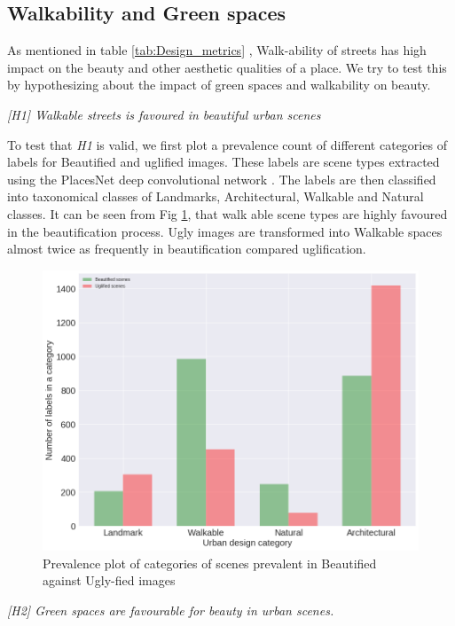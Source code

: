 \subsection{Walkability and Green spaces}
As mentioned in table \ref{tab:Design_metrics} , Walk-ability of streets has high impact on the beauty and other aesthetic qualities of a place. We try to test this by hypothesizing about the impact of green spaces and walkability on beauty.
\par
\textit{[H1] Walkable streets is favoured in beautiful urban scenes}
\par
To test that \textit{H1} is valid, we first plot a prevalence count of different categories of labels for Beautified and uglified images. These labels are scene types extracted using the PlacesNet deep convolutional network \cite{zhou2014learning}. The labels are then classified into taxonomical classes of Landmarks, Architectural, Walkable and Natural classes.  It can be seen from Fig \ref{fig:taxonomyCount}, that walk able scene types are highly favoured in the beautification process. Ugly images are transformed into Walkable spaces almost twice as frequently in beautification compared uglification.
\begin{figure}[h]
	\centering
	\includegraphics[width=\columnwidth]{Plot/taxonomyCount.png}
	\caption{Prevalence plot of categories of scenes prevalent in Beautified against Ugly-fied images}
	\label{fig:taxonomyCount}
\end{figure}

\par
\textit{[H2] Green spaces are favourable for beauty in urban scenes.  }
\par


